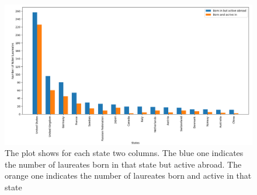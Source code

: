 \documentclass{article}
\begin{document}
\begin{figure}[H]
	\centering
	\includegraphics[width=\textwidth]{../queries/plots/laureatesComparison.png}
	\caption{The plot shows for each state two columns. The blue one indicates the number of laureates born in that state but active abroad.
		The orange one indicates the number of laureates born and active in that state}
	\label{fig:laureatesComparison}
\end{figure}
\end{document}

